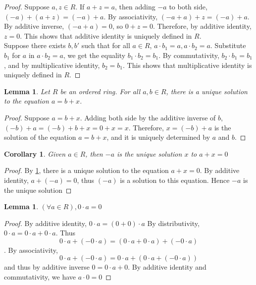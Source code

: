 \documentclass{article}
\newtheorem{cor}[thm]{Corollary}
\newtheorem{lem}[thm]{Lemma}
\begin{document}
\begin{proof}
Suppose $a, z \in R$. If $a+z=a$, then adding $-a$ to both side, $(-a) + (a+z) = (-a) + a$. By associativity, $(-a + a) + z = (-a) + a$. By additive inverse, $(-a + a) = 0$, so $0 + z = 0$. Therefore, by additive identity, $z = 0$. This shows that additive identity is uniquely defined in $R$. \\
Suppose there exists $b, b'$ such that for all $a \in R$, $a \cdot b_1 = a, a\cdot b_2 = a$. Substitute $b_1$ for $a$ in $a \cdot b_2 = a$, we get the equality $b_1 \cdot b_2 = b_1$. By commutativity, $b_2 \cdot b_1 = b_1$, and by multiplicative identity, $b_2 = b_1$. This shows that multiplicative identity is uniquely defined in $R$.
\end{proof}

\begin{lem}
\label{0.5}
Let $R$ be an ordered ring. For all $a, b \in R$, there is a unique solution to the equation $a = b + x$. 
\end{lem}

\begin{proof}
Suppose $a = b + x$. Adding both side by the additive inverse of $b$, $(-b)+a=(-b)+b+x=0+x=x$. Therefore, $x=(-b)+a$ is the solution of the equation $a = b+x$, and it is uniquely determined by $a$ and $b$.
\end{proof}

\begin{cor}
\label{0.4}
Given $a \in R$, then $-a$ is the unique solution $x$ to $a+x=0$
\end{cor}
\begin{proof}
By \ref{0.5}, there is a unique solution to the equation $a+x=0$. By additive identity, $a+(-a)=0$, thus $(-a)$ is a solution to this equation. Hence $-a$ is the unique solution
\end{proof}

\begin{lem} 
\label{0.1.1}
$(\forall a \in R), 0\cdot a =0$
\end{lem}

\begin{proof}
By additive identity, $0\cdot a=(0+0)\cdot a$ By distributivity, $0\cdot a=0\cdot a+ 0 \cdot a$. Thus $$0\cdot a+(-0\cdot a)= (0\cdot a+0\cdot a)+(-0\cdot a)$$. By associativity, $$0\cdot a+(-0\cdot a)= 0\cdot a+(0\cdot a+(-0\cdot a))$$ and thus by additive inverse $0= 0\cdot a+0$. By additive identity and commutativity, we have $a\cdot 0=0$
\end{proof}
\end{document}
